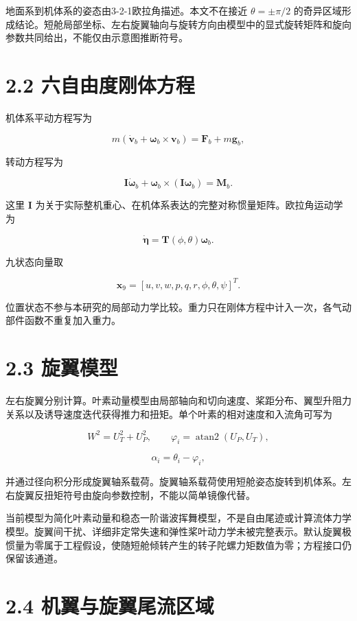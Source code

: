 \documentclass[UTF8,12pt,openany]{ctexbook}
\begin{document}
地面系到机体系的姿态由3-2-1欧拉角描述。本文不在接近 $\theta=\pm\pi/2$ 的奇异区域形成结论。短舱局部坐标、左右旋翼轴向与旋转方向由模型中的显式旋转矩阵和旋向参数共同给出，不能仅由示意图推断符号。

\section{2.2 六自由度刚体方程}

机体系平动方程写为

$$m(\dot{\mathbf{v}}_b+\boldsymbol{\omega}_b\times\mathbf{v}_b)
=\mathbf{F}_b+m\mathbf{g}_b,$$

转动方程写为

$$\mathbf{I}\dot{\boldsymbol{\omega}}_b
+\boldsymbol{\omega}_b\times(\mathbf{I}\boldsymbol{\omega}_b)
=\mathbf{M}_b.$$

这里 $\mathbf{I}$ 为关于实际整机重心、在机体系表达的完整对称惯量矩阵。欧拉角运动学为

$$\dot{\boldsymbol{\eta}}=\mathbf{T}(\phi,\theta)\boldsymbol{\omega}_b.$$

九状态向量取

$$\mathbf{x}_9=[u,v,w,p,q,r,\phi,\theta,\psi]^T.$$

位置状态不参与本研究的局部动力学比较。重力只在刚体方程中计入一次，各气动部件函数不重复加入重力。

\section{2.3 旋翼模型}

左右旋翼分别计算。叶素动量模型由局部轴向和切向速度、桨距分布、翼型升阻力关系以及诱导速度迭代获得推力和扭矩。单个叶素的相对速度和入流角可写为

$$W^2=U_T^2+U_P^2,\qquad \varphi_i=\operatorname{atan2}(U_P,U_T),$$

$$\alpha_i=\theta_i-\varphi_i,$$

并通过径向积分形成旋翼轴系载荷。旋翼轴系载荷使用短舱姿态旋转到机体系。左右旋翼反扭矩符号由旋向参数控制，不能以简单镜像代替。

当前模型为简化叶素动量和稳态一阶谐波挥舞模型，不是自由尾迹或计算流体力学模型。旋翼间干扰、详细非定常失速和弹性桨叶动力学未被完整表示。默认旋翼极惯量为零属于工程假设，使随短舱倾转产生的转子陀螺力矩数值为零；方程接口仍保留该通道。

\section{2.4 机翼与旋翼尾流区域}
\end{document}
